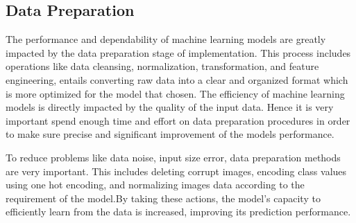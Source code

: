 \documentclass[12pt,onecolumn]{report}
\begin{document}
\subsection{Data Preparation}
The performance and dependability of machine learning models are greatly impacted by the data preparation stage of implementation. This process includes operations like data cleansing, normalization, transformation, and feature engineering, entails converting raw data into a clear and organized format which is more optimized for the model that chosen. The efficiency of machine learning models is directly impacted by the quality of the input data. Hence it is very important spend enough time and effort on data preparation procedures in order to make sure precise and significant improvement of the models performance. 

To reduce problems like data noise, input size error, data preparation methods are very important. This includes deleting corrupt images, encoding class values using one hot encoding, and normalizing images data according to the requirement of the model.By taking these actions, the model's capacity to efficiently learn from the data is increased, improving its prediction performance. 
\end{document}
